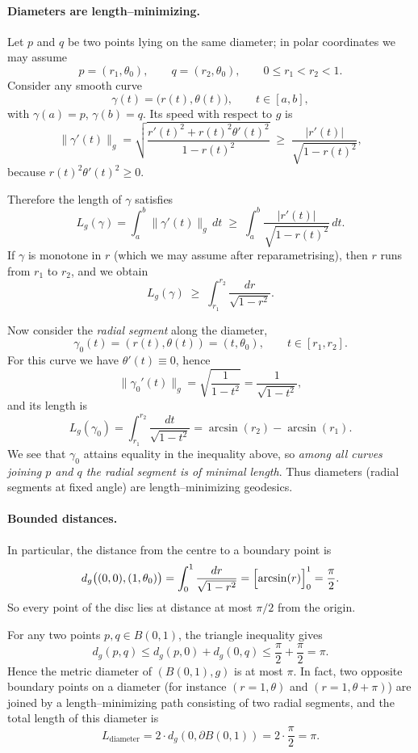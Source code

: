 \documentclass[12pt,a4paper]{article}
\theoremstyle{plain}
\theoremstyle{definition}      %
\begin{document}
	\paragraph{Diameters are length--minimizing.}
	Let $p$ and $q$ be two points lying on the same diameter; in polar
	coordinates we may assume
	\[
	p = (r_1,\theta_0),\qquad q = (r_2,\theta_0),\qquad 0\le r_1<r_2<1.
	\]
	Consider any smooth curve
	\[
	\gamma(t) = \bigl(r(t),\theta(t)\bigr),\qquad t\in[a,b],
	\]
	with $\gamma(a)=p$, $\gamma(b)=q$.
	Its speed with respect to $g$ is
	\[
	\|\gamma'(t)\|_g
	= \sqrt{\frac{r'(t)^2 + r(t)^2 \theta'(t)^2}{1-r(t)^2}}
	\;\ge\; \frac{|r'(t)|}{\sqrt{1-r(t)^2}},
	\]
	because $r(t)^2\theta'(t)^2\ge 0$.
	
	Therefore the length of $\gamma$ satisfies
	\[
	L_g(\gamma)
	= \int_a^b \|\gamma'(t)\|_g\,dt
	\;\ge\; \int_a^b \frac{|r'(t)|}{\sqrt{1-r(t)^2}}\,dt.
	\]
	If $\gamma$ is monotone in $r$ (which we may assume after reparametrising),
	then $r$ runs from $r_1$ to $r_2$, and we obtain
	\[
	L_g(\gamma)
	\;\ge\; \int_{r_1}^{r_2} \frac{dr}{\sqrt{1-r^2}}.
	\]
	
	Now consider the \emph{radial segment} along the diameter,
	\[
	\gamma_0(t) = (r(t),\theta(t)) = (t,\theta_0),\qquad t\in[r_1,r_2].
	\]
	For this curve we have $\theta'(t)\equiv 0$, hence
	\[
	\|\gamma_0'(t)\|_g
	= \sqrt{\frac{1}{1-t^2}}
	= \frac{1}{\sqrt{1-t^2}},
	\]
	and its length is
	\[
	L_g(\gamma_0)
	= \int_{r_1}^{r_2} \frac{dt}{\sqrt{1-t^2}}
	= \arcsin(r_2) - \arcsin(r_1).
	\]
	We see that $\gamma_0$ attains equality in the inequality above, so
	\emph{among all curves joining $p$ and $q$ the radial segment is of minimal
		length}.  Thus diameters (radial segments at fixed angle) are
	length--minimizing geodesics.
	
	\paragraph{Bounded distances.}
	In particular, the distance from the centre to a boundary point is
	\[
	d_g\bigl((0,0),(1,\theta_0)\bigr)
	= \int_0^1 \frac{dr}{\sqrt{1-r^2}}
	= \Bigl[\arcsin(r)\Bigr]_{0}^{1}
	= \frac{\pi}{2}.
	\]
	So every point of the disc lies at distance at most $\pi/2$ from the origin.
	
	For any two points $p,q\in B(0,1)$, the triangle inequality gives
	\[
	d_g(p,q)
	\le d_g(p,0) + d_g(0,q)
	\le \frac{\pi}{2} + \frac{\pi}{2}
	= \pi.
	\]
	Hence the metric diameter of $(B(0,1),g)$ is at most $\pi$.  In fact, two
	opposite boundary points on a diameter (for instance $(r=1,\theta)$ and
	$(r=1,\theta+\pi)$) are joined by a length--minimizing path consisting of
	two radial segments, and the total length of this diameter is
	\[
	L_{\text{diameter}}
	= 2\cdot d_g(0,\partial B(0,1))
	= 2\cdot\frac{\pi}{2}
	= \pi.
	\]
	
\end{document}
